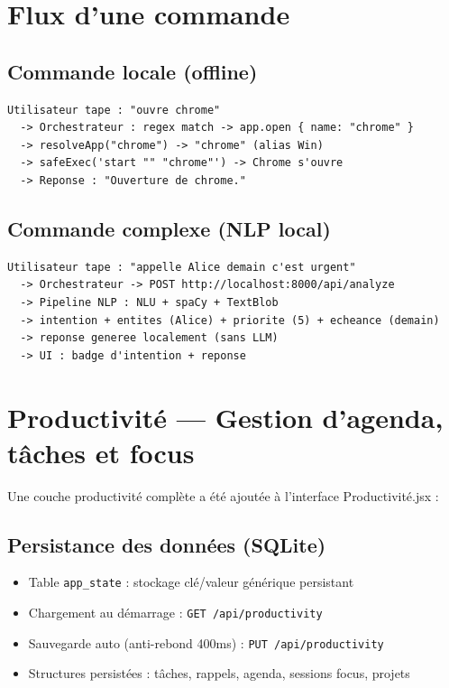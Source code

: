 \documentclass[12pt,a4paper]{article}
\begin{document}
\section{Flux d'une commande}

\subsection*{Commande locale (offline)}

\begin{lstlisting}
Utilisateur tape : "ouvre chrome"
  -> Orchestrateur : regex match -> app.open { name: "chrome" }
  -> resolveApp("chrome") -> "chrome" (alias Win)
  -> safeExec('start "" "chrome"') -> Chrome s'ouvre
  -> Reponse : "Ouverture de chrome."
\end{lstlisting}

\subsection*{Commande complexe (NLP local)}

\begin{lstlisting}
Utilisateur tape : "appelle Alice demain c'est urgent"
  -> Orchestrateur -> POST http://localhost:8000/api/analyze
  -> Pipeline NLP : NLU + spaCy + TextBlob
  -> intention + entites (Alice) + priorite (5) + echeance (demain)
  -> reponse generee localement (sans LLM)
  -> UI : badge d'intention + reponse
\end{lstlisting}

\section{Productivité — Gestion d'agenda, tâches et focus}

Une couche productivité complète a été ajoutée à l'interface Productivité.jsx :

\subsection*{Persistance des données (SQLite)}

\begin{itemize}
  \item Table \texttt{app\_state} : stockage clé/valeur générique persistant
  \item Chargement au démarrage : \texttt{GET /api/productivity}
  \item Sauvegarde auto (anti-rebond 400ms) : \texttt{PUT /api/productivity}
  \item Structures persistées : tâches, rappels, agenda, sessions focus, projets
\end{itemize}
\end{document}
